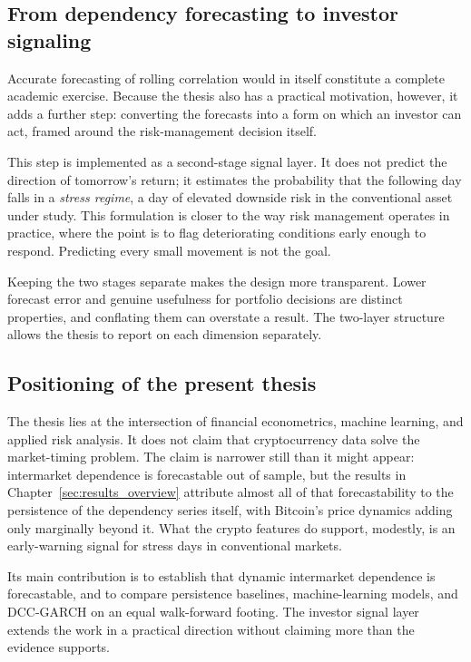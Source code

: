 \subsection{From dependency forecasting to investor signaling}

Accurate forecasting of rolling correlation would in itself constitute a complete academic exercise. Because the thesis also has a practical motivation, however, it adds a further step: converting the forecasts into a form on which an investor can act, framed around the risk-management decision itself.

This step is implemented as a second-stage signal layer. It does not predict the direction of tomorrow's return; it estimates the probability that the following day falls in a \emph{stress regime}, a day of elevated downside risk in the conventional asset under study. This formulation is closer to the way risk management operates in practice, where the point is to flag deteriorating conditions early enough to respond. Predicting every small movement is not the goal.

Keeping the two stages separate makes the design more transparent. Lower forecast error and genuine usefulness for portfolio decisions are distinct properties, and conflating them can overstate a result. The two-layer structure allows the thesis to report on each dimension separately.

\subsection{Positioning of the present thesis}

The thesis lies at the intersection of financial econometrics, machine learning, and applied risk analysis. It does not claim that cryptocurrency data solve the market-timing problem. The claim is narrower still than it might appear: intermarket dependence is forecastable out of sample, but the results in Chapter~\ref{sec:results_overview} attribute almost all of that forecastability to the persistence of the dependency series itself, with Bitcoin's price dynamics adding only marginally beyond it. What the crypto features do support, modestly, is an early-warning signal for stress days in conventional markets.

Its main contribution is to establish that dynamic intermarket dependence is forecastable, and to compare persistence baselines, machine-learning models, and DCC-GARCH on an equal walk-forward footing. The investor signal layer extends the work in a practical direction without claiming more than the evidence supports.
